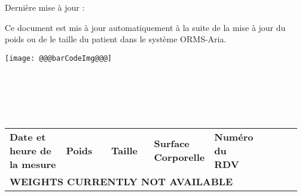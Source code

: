 \documentclass[12pt]{article}
\begin{document}
\begin{minipage}{0.65\textwidth}
\hspace{-0.22in} Derni\`{e}re mise \`{a} jour : \textbf{\color{black}{@@@now@@@}}\\
\bigskip

\vspace{-0.22in}
\hspace{-0.22in} Ce document est mis \`{a} jour automatiquement \`{a} la suite de la mise \`{a} jour du poids ou de le taille du patient dans le syst\`{e}me ORMS-Aria.
\end{minipage}
\begin{minipage}{0.25\textwidth}
\begin{flushright}
\texttt{[image: @@@barCodeImg@@@]}
\end{flushright}
\end{minipage}

\begin{center}
\end{center}
\vspace{-0.3in}

\normalsize
{}
{\renewcommand{\arraystretch}{1.5}%

\hfill\\
\hfill\\
\hfill\\
\hfill\\


\begin{longtable}
{
    |p{0.2\linewidth}
    |p{0.16\linewidth}
    |p{0.155\linewidth}
    |p{0.15\linewidth}
    |p{0.15\linewidth}
    |p{0.15\linewidth}
    |
}
\hline
\rowcolor{babyblueeyes}
    \textbf{Date et heure de la mesure}
    &\textbf{Poids}
    &\textbf{Taille}
    &\textbf{Surface \newline Corporelle}
    &\textbf{Num\'{e}ro \newline du RDV}\\
\multicolumn{6}{l}{\textbf{WEIGHTS CURRENTLY NOT AVAILABLE}}\\
\hline
\endhead
\hline
\hline

\end{longtable}}
\end{document}
